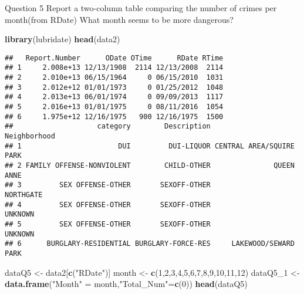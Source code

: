 \documentclass[]{article}
\newenvironment{Shaded}{\begin{snugshade}}{\end{snugshade}}
\newcommand{\DecValTok}[1]{\textcolor[rgb]{0.00,0.00,0.81}{#1}}
\newcommand{\KeywordTok}[1]{\textcolor[rgb]{0.13,0.29,0.53}{\textbf{#1}}}
\newcommand{\NormalTok}[1]{#1}
\newcommand{\StringTok}[1]{\textcolor[rgb]{0.31,0.60,0.02}{#1}}
\begin{document}
Question 5 Report a two-column table comparing the number of crimes per
month(from RDate) What month seems to be more dangerous?

\begin{Shaded}
\begin{Highlighting}[]
\KeywordTok{library}\NormalTok{(lubridate)}
\KeywordTok{head}\NormalTok{(data2)}
\end{Highlighting}
\end{Shaded}

\begin{verbatim}
##   Report.Number      ODate OTime      RDate RTime
## 1     2.008e+13 12/13/1908  2114 12/13/2008  2114
## 2     2.010e+13 06/15/1964     0 06/15/2010  1031
## 3     2.012e+12 01/01/1973     0 01/25/2012  1048
## 4     2.013e+13 06/01/1974     0 09/09/2013  1117
## 5     2.016e+13 01/01/1975     0 08/11/2016  1054
## 6     1.975e+12 12/16/1975   900 12/16/1975  1500
##                    category        Description             Neighborhood
## 1                       DUI         DUI-LIQUOR CENTRAL AREA/SQUIRE PARK
## 2 FAMILY OFFENSE-NONVIOLENT        CHILD-OTHER               QUEEN ANNE
## 3         SEX OFFENSE-OTHER       SEXOFF-OTHER                NORTHGATE
## 4         SEX OFFENSE-OTHER       SEXOFF-OTHER                  UNKNOWN
## 5         SEX OFFENSE-OTHER       SEXOFF-OTHER                  UNKNOWN
## 6      BURGLARY-RESIDENTIAL BURGLARY-FORCE-RES     LAKEWOOD/SEWARD PARK
\end{verbatim}

\begin{Shaded}
\begin{Highlighting}[]
\NormalTok{dataQ5 <-}\StringTok{ }\NormalTok{data2[}\KeywordTok{c}\NormalTok{(}\StringTok{"RDate"}\NormalTok{)]}
\NormalTok{month <-}\StringTok{ }\KeywordTok{c}\NormalTok{(}\DecValTok{1}\NormalTok{,}\DecValTok{2}\NormalTok{,}\DecValTok{3}\NormalTok{,}\DecValTok{4}\NormalTok{,}\DecValTok{5}\NormalTok{,}\DecValTok{6}\NormalTok{,}\DecValTok{7}\NormalTok{,}\DecValTok{8}\NormalTok{,}\DecValTok{9}\NormalTok{,}\DecValTok{10}\NormalTok{,}\DecValTok{11}\NormalTok{,}\DecValTok{12}\NormalTok{)}
\NormalTok{dataQ5_}\DecValTok{1}\NormalTok{ <-}\StringTok{ }\KeywordTok{data.frame}\NormalTok{(}\StringTok{"Month"}\NormalTok{ =}\StringTok{ }\NormalTok{month,}\StringTok{"Total_Num"}\NormalTok{=}\KeywordTok{c}\NormalTok{(}\DecValTok{0}\NormalTok{))}
\KeywordTok{head}\NormalTok{(dataQ5)}
\end{Highlighting}
\end{Shaded}
\end{document}
